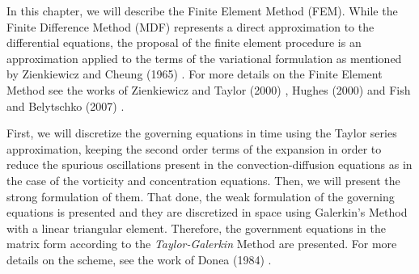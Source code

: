 In this chapter, we will describe the Finite Element Method (FEM). 
While the Finite Difference Method (MDF) represents
 a direct approximation to the differential equations, 
the proposal of the finite element procedure is 
an approximation applied to the terms of the 
variational formulation as mentioned by Zienkiewicz and Cheung (1965) 
\cite{zienkiewicz1965}. 
For more details on the Finite Element Method see the works of 
Zienkiewicz and Taylor (2000) \cite{zienkiewiczvol3}, 
Hughes (2000) \cite{hughes2000} and 
Fish and Belytschko (2007) \cite{fish2007}.
\par

First, we will discretize the governing equations in time 
using the Taylor series approximation, keeping the second order 
terms of the expansion in order to reduce the spurious oscillations 
present in the convection-diffusion equations as 
in the case of the vorticity and concentration equations. 
Then, we will present the strong formulation of them. 
That done, the weak formulation of the governing equations is 
presented and they are discretized in space using Galerkin's Method 
with a linear triangular element. 
Therefore, the government equations in the matrix form 
according to the \textit{Taylor-Galerkin} Method are presented. 
For more details on the scheme, see the work of 
Donea (1984) \cite{donea1984}.
